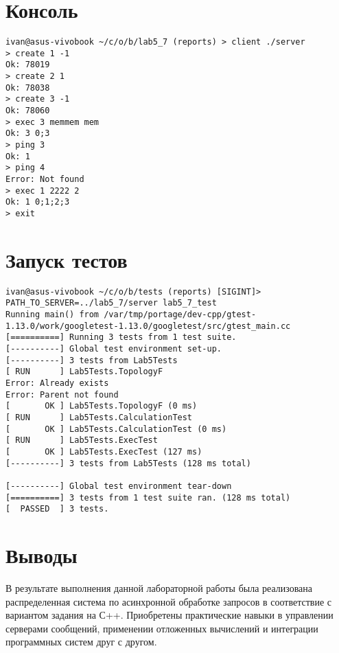 \documentclass[a4paper, 12pt]{article}
\begin{document}
\newpage

\section{Консоль}
\begin{verbatim}
ivan@asus-vivobook ~/c/o/b/lab5_7 (reports) > client ./server
> create 1 -1
Ok: 78019
> create 2 1
Ok: 78038
> create 3 -1
Ok: 78060
> exec 3 memmem mem
Ok: 3 0;3
> ping 3
Ok: 1
> ping 4
Error: Not found
> exec 1 2222 2 
Ok: 1 0;1;2;3
> exit
\end{verbatim}

\section{Запуск тестов}
\begin{verbatim}
ivan@asus-vivobook ~/c/o/b/tests (reports) [SIGINT]> PATH_TO_SERVER=../lab5_7/server lab5_7_test
Running main() from /var/tmp/portage/dev-cpp/gtest-1.13.0/work/googletest-1.13.0/googletest/src/gtest_main.cc
[==========] Running 3 tests from 1 test suite.
[----------] Global test environment set-up.
[----------] 3 tests from Lab5Tests
[ RUN      ] Lab5Tests.TopologyF
Error: Already exists
Error: Parent not found
[       OK ] Lab5Tests.TopologyF (0 ms)
[ RUN      ] Lab5Tests.CalculationTest
[       OK ] Lab5Tests.CalculationTest (0 ms)
[ RUN      ] Lab5Tests.ExecTest
[       OK ] Lab5Tests.ExecTest (127 ms)
[----------] 3 tests from Lab5Tests (128 ms total)

[----------] Global test environment tear-down
[==========] 3 tests from 1 test suite ran. (128 ms total)
[  PASSED  ] 3 tests.
\end{verbatim}
\newpage

\section{Выводы}

В результате выполнения данной лабораторной работы была реализована распределенная система по асинхронной обработке запросов в соответствие с вариантом задания на С++. Приобретены практические навыки в управлении серверами сообщений, применении отложенных вычислений и интеграции программных систем друг с другом.
\end{document}
